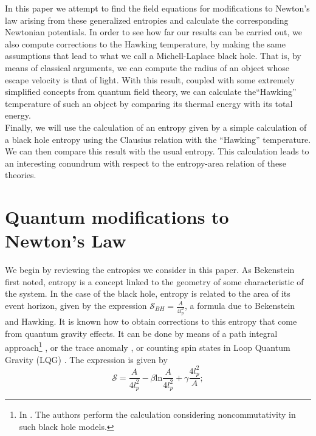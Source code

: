 \documentclass[nofootinbib,aps,prd,preprint,groupedaddress,showpacs,showkeys]{revtex4-1}
\begin{document}
\indent In this paper we attempt to find the field equations for modifications to Newton's law arising from these generalized entropies and calculate the corresponding Newtonian potentials. In order to see how far our results can be carried out, we also compute corrections to the Hawking temperature, by making the same assumptions that lead to what we call a Michell-Laplace black hole. That is, by means of classical arguments, we can compute the radius of an object whose escape velocity is that of light. With this result, coupled with some extremely simplified concepts from quantum field theory, we can calculate the``Hawking'' temperature of such an object by comparing its thermal energy with its total energy.\\
\indent Finally, we will use the calculation of an entropy given by a simple calculation of a black hole entropy using the Clausius relation with the ``Hawking'' temperature. We can then compare this result with the usual entropy. This calculation leads to an interesting conundrum with respect to the entropy-area relation of these theories.

\section{Quantum modifications to Newton's Law}

\noindent We begin by reviewing the entropies we consider in this paper. As Bekenstein first noted, entropy is a concept linked to the geometry of some characteristic of the system. In the case of the black hole, entropy is related to the area of its event horizon, given by the expression $\mathcal{S}_{BH} = \frac{A}{4 l_p^2}$, a formula due to Bekenstein and Hawking. It is known how to obtain corrections to this entropy that come from quantum gravity effects. It can be done by means of a path integral approach\footnote{In \cite{LOSR}. The authors perform the calculation considering noncommutativity in such black hole models.} \cite{OST}, or the trace anomaly \cite{Fursaev}, or counting spin states in Loop Quantum Gravity (LQG) \cite{RovAsh}. The expression is given by
\begin{equation}
\mathcal{S} = \frac{A}{4 l_p^2} - \beta \mathrm{ln} \frac{A}{4 l_p^2} + \gamma \frac{4 l_p^2}{A}; \label{LQGe}
\end{equation}
\end{document}
